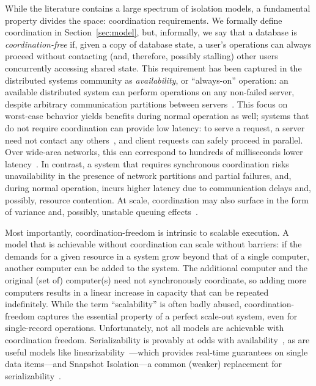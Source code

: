  While the literature contains
a large spectrum of isolation models, a fundamental property divides
the space: coordination requirements. We formally define coordination
in Section~\ref{sec:model}, but, informally, we say that a database is
\textit{coordination-free} if, given a copy of database state, a
user's operations can always proceed without contacting (and,
therefore, possibly stalling) other users concurrently accessing
shared state. This requirement has been captured in the distributed
systems community as \textit{availability}, or ``always-on''
operation: an available distributed system can perform operations on
any non-failed server, despite arbitrary communication partitions
between servers~\cite{gilbert-cap}. This focus on worst-case behavior
yields benefits during normal operation as well; systems that do not
require coordination can provide low latency: to serve a request, a
server need not contact any others~\cite{pacelc}, and client requests
can safely proceed in parallel. Over wide-area networks, this can
correspond to hundreds of milliseconds lower
latency~\cite{hat-vldb}. In contrast, a system that requires
synchronous coordination risks unavailability in the presence of
network partitions and partial failures, and, during normal operation,
incurs higher latency due to communication delays and, possibly,
resource contention. At scale, coordination may also surface in the
form of variance and, possibly, unstable queuing effects~\cite{ladis}.



Most importantly, coordination-freedom is intrinsic to scalable
execution. A model that is achievable without coordination can scale
without barriers: if the demands for a given resource in a system grow
beyond that of a single computer, another computer can be added to the
system. The additional computer and the original (set of) computer(s)
need not synchronously coordinate, so adding more computers results in
a linear increase in capacity that can be repeated indefinitely. While
the term ``scalability'' is often badly abused, coordination-freedom
captures the essential property of a perfect scale-out system, even
for single-record operations.  Unfortunately, not all models are
achievable with coordination freedom. Serializability is provably at
odds with availability~\cite{davidson-survey}, as are useful models
like linearizability~\cite{gilbert-cap}---which provides real-time
guarantees on single data items---and Snapshot Isolation---a common
(weaker) replacement for serializability~\cite{hat-vldb}.

